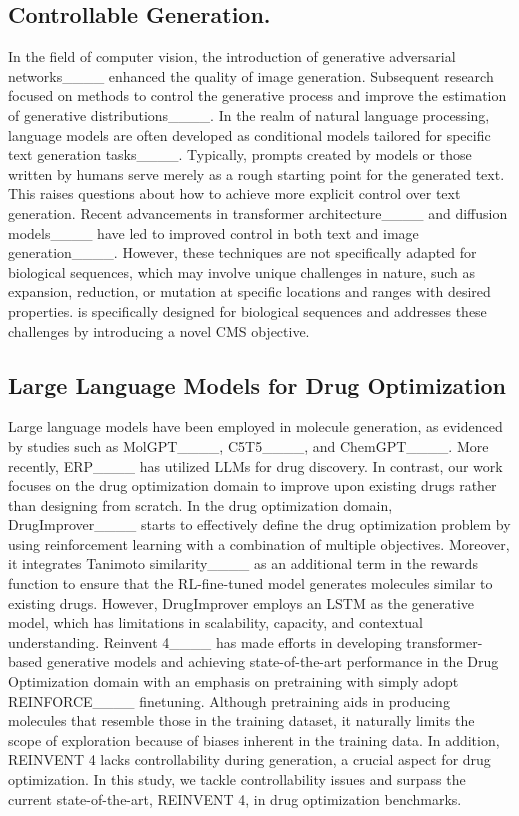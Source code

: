 \subsection{Controllable Generation.}
In the field of computer vision, the introduction of generative adversarial networks____  enhanced the quality of image generation. Subsequent research focused on methods to control the generative process and improve the estimation of generative distributions____. In the realm of natural language processing, language models are often developed as conditional models tailored for specific text generation tasks____. Typically, prompts created by models or those written by humans serve merely as a rough starting point for the generated text. This raises questions about how to achieve more explicit control over text generation. Recent advancements in transformer architecture____ and diffusion models____ have led to improved control in both text and image generation____. However, these techniques are not specifically adapted for biological sequences, which may involve unique challenges in nature, such as expansion, reduction, or mutation at specific locations and ranges with desired properties. 
\algname is specifically designed for biological sequences and addresses these challenges by introducing a novel CMS objective.


\subsection{Large Language Models for Drug Optimization}



Large language models have been employed in molecule generation, as evidenced by studies such as MolGPT____, C5T5____, and ChemGPT____. More recently, ERP____ has utilized LLMs for drug discovery. In contrast, our work focuses on the drug optimization domain to improve upon existing drugs rather than designing from scratch. In the drug optimization domain, 
DrugImprover____ starts to effectively define the drug optimization problem by using reinforcement learning with a combination of multiple objectives. Moreover, it integrates Tanimoto similarity____ as an additional term in the rewards function to ensure that the RL-fine-tuned model generates molecules similar to existing drugs. However, DrugImprover employs an LSTM as the generative model, which has limitations in scalability, capacity, and contextual understanding.
Reinvent 4____ has made efforts in developing transformer-based generative models and achieving state-of-the-art performance in the Drug Optimization domain with an emphasis on pretraining with simply adopt REINFORCE____ finetuning. 
Although pretraining aids in producing molecules that resemble those in the training dataset, it naturally limits the scope of exploration because of biases inherent in the training data.
In addition, REINVENT 4 lacks controllability during generation, a crucial aspect for drug optimization. In this study, we tackle controllability issues and surpass the current state-of-the-art, REINVENT 4, in drug optimization benchmarks.